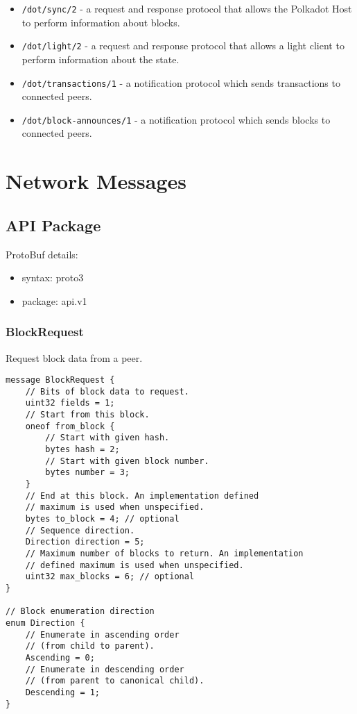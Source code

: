 \documentclass{book}
\begin{document}
\begin{itemize}
    \item \verb|/dot/sync/2| - a request and response protocol that
    allows the Polkadot Host to perform information about blocks.
    \item \verb|/dot/light/2| - a request and response protocol that
    allows a light client to perform information about the state.
    \item \verb|/dot/transactions/1| - a notification protocol which
    sends transactions to connected peers.
    \item \verb|/dot/block-announces/1| - a notification protocol
    which sends blocks to connected peers.
\end{itemize}

\section{Network Messages}

\subsection{API Package}

ProtoBuf details:

\begin{itemize}
    \item syntax: proto3
    \item package: api.v1
\end{itemize}

\subsubsection{BlockRequest}

Request block data from a peer.

\begin{lstlisting}[frame=single]
message BlockRequest {
    // Bits of block data to request.
    uint32 fields = 1;
    // Start from this block.
    oneof from_block {
        // Start with given hash.
        bytes hash = 2;
        // Start with given block number.
        bytes number = 3;
    }
    // End at this block. An implementation defined
    // maximum is used when unspecified.
    bytes to_block = 4; // optional
    // Sequence direction.
    Direction direction = 5;
    // Maximum number of blocks to return. An implementation 
    // defined maximum is used when unspecified.
    uint32 max_blocks = 6; // optional
}

// Block enumeration direction
enum Direction {
    // Enumerate in ascending order
    // (from child to parent).
    Ascending = 0;
    // Enumerate in descending order 
    // (from parent to canonical child).
    Descending = 1;
}
\end{lstlisting}
\end{document}
